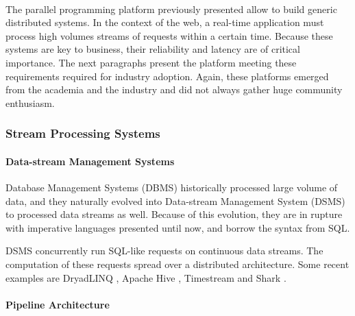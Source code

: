 \paragraph{}

The parallel programming platform previously presented allow to build generic distributed systems.
In the context of the web, a real-time application must process high volumes streams of requests within a certain time.
Because these systems are key to business, their reliability and latency are of critical importance.
The next paragraphs present the platform meeting these requirements required for industry adoption.
Again, these platforms emerged from the academia and the industry and did not always gather huge community enthusiasm.


\subsubsection{Stream Processing Systems}


\paragraph{Data-stream Management Systems}

Database Management Systems (DBMS) historically processed large volume of data, and they naturally evolved into Data-stream Management System (DSMS) to processed data streams as well.
Because of this evolution, they are in rupture with imperative languages presented until now, and borrow the syntax from SQL.

DSMS concurrently run SQL-like requests on continuous data streams.
The computation of these requests spread over a distributed architecture.
Some recent examples are
DryadLINQ \cite{Isard2007,Yu2009},
Apache Hive \cite{Thusoo2009},
Timestream \cite{Qian2013} and
Shark \cite{Xin2013}.


\paragraph{Pipeline Architecture}

